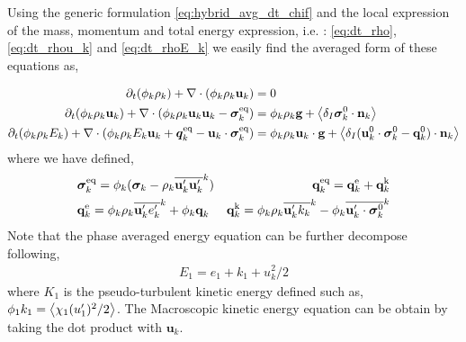 Using the generic formulation \ref{eq:hybrid_avg_dt_chif} and the local expression of the mass, momentum and total energy expression, i.e. : \ref{eq:dt_rho},\ref{eq:dt_rhou_k} and \ref{eq:dt_rhoE_k} we easily find the averaged form of these equations as, 

\begin{align}
    \label{eq:dt_&vg_rho}
    \partial_t (\phi_k \rho_k)  
    + \mathbf{\nabla}\cdot (
        \phi_k \rho_k\textbf{u}_k
    )
    &= 
    0\\
    \label{eq:dt_&vg_rhou_k}
    \partial_t (\phi_k \rho_k\textbf{u}_k)  
    + \mathbf{\nabla}\cdot (
        \phi_k \rho_k\textbf{u}_k\textbf{u}_k
        - \bm{\sigma}_k^\text{eq}
    )
    &= 
    \phi_k \rho_k \textbf{g} 
    +  \left<\delta_I \bm{\sigma}_k^0 \cdot \textbf{n}_k\right>\\
    \label{eq:dt_&vg_rhoE_k}
    \partial_t (\phi_k\rho_kE_k)  
    + \mathbf{\nabla}\cdot (
        \phi_k\rho_kE_k\textbf{u}_k
        + \bm{q}_k^\text{eq}
        - \textbf{u}_k \cdot \bm{\sigma}_k^\text{eq}
        )
    &= 
    \phi_k \rho_k\textbf{u}_k \cdot \textbf{g} 
    + \left<\delta_I (\textbf{u}_k^0 \cdot \bm{\sigma}_k^0 - \textbf{q}_k^0)\cdot \textbf{n}_k\right>
\end{align} 
where we have defined, 
\begin{align*}
    &\bm{\sigma}_k^\text{eq}
    = \phi_k (
        \bm{\sigma}_k%
        - \rho_k \kavg{\textbf{u}_k'\textbf{u}_k'})  
    &\textbf{q}_k^\text{eq}
    =\textbf{q}_k^\text{e} +\textbf{q}_k^\text{k}  \\
    &\textbf{q}_k^\text{e}
    = \phi_k\rho_k \kavg{\textbf{u}_k' e_k'} 
    + \phi_k\textbf{q}_k 
    &\textbf{q}_k^\text{k}
    = \phi_k\rho_k \kavg{\textbf{u}_k' k_k} 
    - \phi_k\kavg{\textbf{u}_k' \cdot \bm{\sigma}_k^0}
\end{align*}
Note that the phase averaged energy equation can be further decompose following, 
\begin{align*}
    E_1 = e_1 + k_1 + u_k^2/2
\end{align*}
where $K_1$ is the pseudo-turbulent kinetic energy defined such as, $\phi_1 k_1 = \left<\chi_1 (u_1')^2/2\right>$. 
The Macroscopic kinetic energy equation can be obtain by taking the dot product with $\textbf{u}_k$. 
